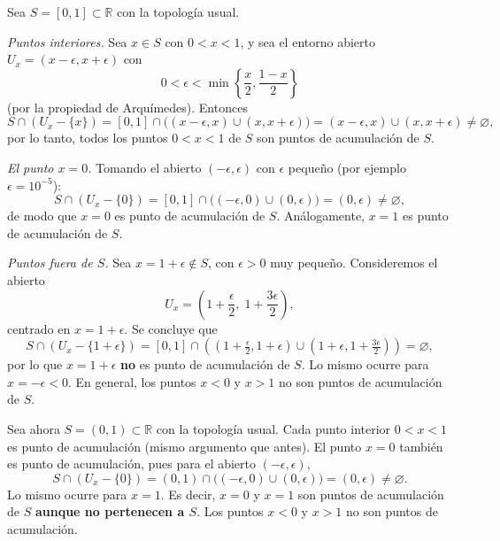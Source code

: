\begin{ejemplo}
Sea $S=[0,1]\subset\mathbb{R}$ con la topología usual.

\emph{Puntos interiores.} Sea $x\in S$ con $0<x<1$, y sea el entorno abierto
$U_x = (x-\epsilon,x+\epsilon)$ con
\[
0 < \epsilon < \min\left\{ \frac{x}{2}, \frac{1-x}{2}\right\}
\]
(por la propiedad de Arquímedes). Entonces
\[
S\cap(U_x-\{x\}) = [0,1]\cap\big((x-\epsilon,x)\cup(x,x+\epsilon)\big)
= (x-\epsilon,x)\cup(x,x+\epsilon) \neq \varnothing,
\]
por lo tanto, todos los puntos $0<x<1$ de $S$ son puntos de acumulación de
$S$.

\emph{El punto $x=0$.} Tomando el abierto $(-\epsilon,\epsilon)$ con
$\epsilon$ pequeño (por ejemplo $\epsilon = 10^{-5}$):
\[
S\cap(U_x-\{0\}) = [0,1]\cap\big((-\epsilon,0)\cup(0,\epsilon)\big) =
(0,\epsilon) \neq \varnothing,
\]
de modo que $x=0$ es punto de acumulación de $S$. Análogamente, $x=1$ es
punto de acumulación de $S$.

\begin{center}
\end{center}

\emph{Puntos fuera de $S$.} Sea $x=1+\epsilon \notin S$, con $\epsilon>0$
muy pequeño. Consideremos el abierto
\[
U_x = \left(1+\frac{\epsilon}{2},\; 1+\frac{3\epsilon}{2}\right),
\]
centrado en $x=1+\epsilon$. Se concluye que
\[
S\cap(U_x - \{1+\epsilon\}) = [0,1]\cap
\left(\left(1+\tfrac{\epsilon}{2},1+\epsilon\right)\cup
\left(1+\epsilon,1+\tfrac{3\epsilon}{2}\right)\right) = \varnothing,
\]
por lo que $x=1+\epsilon$ \textbf{no} es punto de acumulación de $S$. Lo
mismo ocurre para $x=-\epsilon<0$. En general, los puntos $x<0$ y $x>1$ no
son puntos de acumulación de $S$.
\end{ejemplo}

\begin{ejemplo}
Sea ahora $S=(0,1)\subset\mathbb{R}$ con la topología usual. Cada punto
interior $0<x<1$ es punto de acumulación (mismo argumento que antes). El
punto $x=0$ también es punto de acumulación, pues para el abierto
$(-\epsilon,\epsilon)$,
\[
S\cap(U_x-\{0\}) = (0,1)\cap\big((-\epsilon,0)\cup(0,\epsilon)\big) =
(0,\epsilon)\neq\varnothing.
\]
Lo mismo ocurre para $x=1$. Es decir, $x=0$ y $x=1$ son puntos de
acumulación de $S$ \textbf{aunque no pertenecen a $S$}. Los puntos $x<0$ y
$x>1$ no son puntos de acumulación.
\end{ejemplo}

